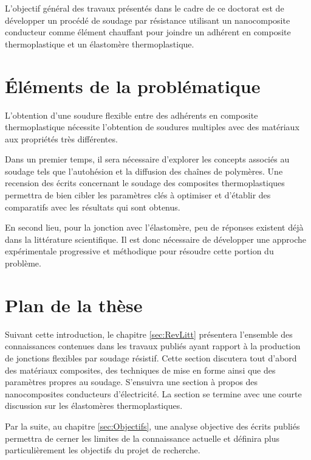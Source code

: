 L'objectif général des travaux présentés dans le cadre de ce doctorat est de développer un procédé de soudage par résistance utilisant un nanocomposite conducteur comme élément chauffant pour joindre un adhérent en composite thermoplastique et un élastomère thermoplastique. 



\section{Éléments de la problématique}

L'obtention d'une soudure flexible entre des adhérents en composite thermoplastique nécessite l'obtention de soudures multiples avec des matériaux aux propriétés très différentes. 

Dans un premier temps, il sera nécessaire d'explorer les concepts associés au soudage tels que l'autohésion et la diffusion des chaînes de polymères. 
Une recension des écrits concernant le soudage des composites thermoplastiques permettra de bien cibler les paramètres clés à optimiser et d'établir des comparatifs avec les résultats qui sont obtenus. 

En second lieu, pour la jonction avec l'élastomère, peu de réponses existent déjà dans la littérature scientifique.
Il est donc nécessaire de développer une approche expérimentale progressive et méthodique pour résoudre cette portion du problème. 

\section{Plan de la thèse}  %

Suivant cette introduction, le chapitre \ref{sec:RevLitt} présentera l'ensemble des connaissances contenues dans les travaux publiés ayant rapport à la production de jonctions flexibles par soudage résistif. 
Cette section discutera tout d'abord des matériaux composites, des techniques de mise en forme ainsi que des paramètres propres au soudage. S'ensuivra une section à propos des nanocomposites conducteurs d'électricité. La section se termine avec une courte discussion sur les élastomères thermoplastiques.

Par la suite, au chapitre \ref{sec:Objectifs}, une analyse objective des écrits publiés permettra de cerner les limites de la connaissance actuelle et définira plus particulièrement les objectifs du projet de recherche. 

